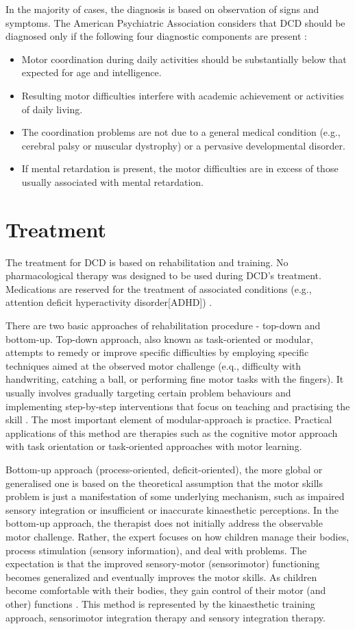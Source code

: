 In the majority of cases, the diagnosis is based on observation of signs and symptoms. The American Psychiatric Association considers that DCD should be diagnosed only if the following four diagnostic components are present \cite{14}:
\begin{itemize} [noitemsep]
\item Motor coordination during daily activities should be substantially below that expected for age and intelligence.
\item Resulting motor difficulties interfere with academic achievement or activities of daily living.
\item The coordination problems are not due to a general medical condition (e.g., cerebral palsy or muscular dystrophy) or a pervasive developmental disorder.
\item If mental retardation is present, the motor difficulties are in excess of those usually associated with mental retardation.
\end{itemize}

\section{Treatment}
The treatment for DCD is based on rehabilitation and training. No pharmacological therapy was designed to be used during DCD's treatment. Medications are reserved for the treatment of associated conditions (e.g., attention deficit hyperactivity disorder[ADHD]) \cite{12}. 

There are two basic approaches of rehabilitation procedure - top-down and bottom-up. Top-down approach, also known as task-oriented or modular, attempts to remedy or improve specific difficulties by employing specific techniques aimed at the observed motor challenge (e.q., difficulty with handwriting, catching a ball, or performing fine motor tasks with the fingers). It usually involves gradually targeting certain problem behaviours and implementing step-by-step interventions that focus on teaching and practising the skill \cite{12}. The most important element of modular-approach is practice. Practical applications of this method are therapies such as the cognitive motor approach with task orientation or task-oriented approaches with motor learning.

Bottom-up approach (process-oriented, deficit-oriented), the more global or generalised one is based on the theoretical assumption that the motor skills problem is just a manifestation of some underlying mechanism, such as impaired sensory integration or insufficient or inaccurate kinaesthetic perceptions. In the bottom-up approach, the therapist does not initially address the observable motor challenge. Rather, the expert focuses on how children manage their bodies, process stimulation (sensory information), and deal with problems. The expectation is that the improved sensory-motor (sensorimotor) functioning becomes generalized and eventually improves the motor skills. As children become comfortable with their bodies, they gain control of their motor (and other) functions \cite{12}. This method is represented by the kinaesthetic training approach, sensorimotor integration therapy and sensory integration therapy. 

